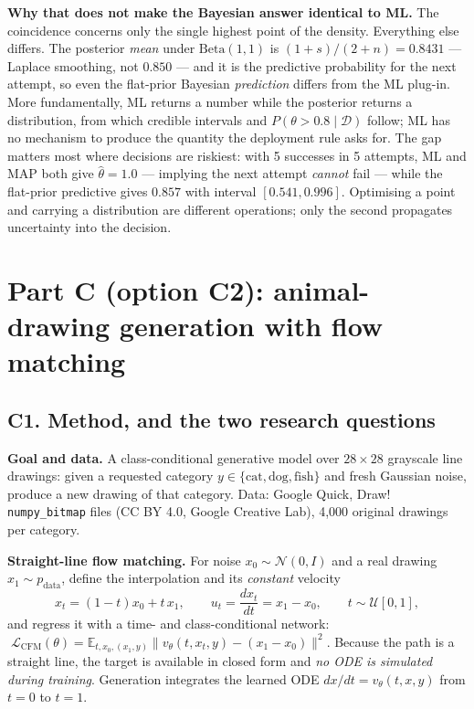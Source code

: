 \documentclass[10pt,a4paper]{article}
\newcommand{\D}{\mathcal{D}}
\begin{document}
\textbf{Why that does not make the Bayesian answer identical to ML.} The coincidence concerns only the
single highest point of the density. Everything else differs. The posterior \emph{mean} under
$\mathrm{Beta}(1,1)$ is $(1{+}s)/(2{+}n)=0.8431$ --- Laplace smoothing, not $0.850$ --- and it is the
predictive probability for the next attempt, so even the flat-prior Bayesian \emph{prediction} differs
from the ML plug-in. More fundamentally, ML returns a number while the posterior returns a
distribution, from which credible intervals and $P(\theta>0.8\mid\D)$ follow; ML has no mechanism to
produce the quantity the deployment rule asks for. The gap matters most where decisions are riskiest:
with 5 successes in 5 attempts, ML and MAP both give $\hat\theta=1.0$ --- implying the next attempt
\emph{cannot} fail --- while the flat-prior predictive gives $0.857$ with interval $[0.541,0.996]$.
Optimising a point and carrying a distribution are different operations; only the second propagates
uncertainty into the decision.

\section{Part C (option C2): animal-drawing generation with flow matching}

\subsection{C1. Method, and the two research questions}

\textbf{Goal and data.} A class-conditional generative model over $28\times28$ grayscale line
drawings: given a requested category $y\in\{\textrm{cat},\textrm{dog},\textrm{fish}\}$ and fresh
Gaussian noise, produce a new drawing of that category. Data: Google Quick, Draw!
\texttt{numpy\_bitmap} files (CC BY 4.0, Google Creative Lab), 4{,}000 original drawings per category.

\textbf{Straight-line flow matching.} For noise $x_0\sim\mathcal{N}(0,I)$ and a real drawing
$x_1\sim p_{\text{data}}$, define the interpolation and its \emph{constant} velocity
\[
x_t=(1-t)x_0+t\,x_1,\qquad u_t=\frac{dx_t}{dt}=x_1-x_0,\qquad t\sim\mathcal{U}[0,1],
\]
and regress it with a time- and class-conditional network:
$\;\mathcal{L}_{\text{CFM}}(\theta)=\mathbb{E}_{t,x_0,(x_1,y)}\big\|v_\theta(t,x_t,y)-(x_1-x_0)\big\|^2$.
Because the path is a straight line, the target is available in closed form and \emph{no ODE is
simulated during training}. Generation integrates the learned ODE
$dx/dt=v_\theta(t,x,y)$ from $t{=}0$ to $t{=}1$.
\end{document}
